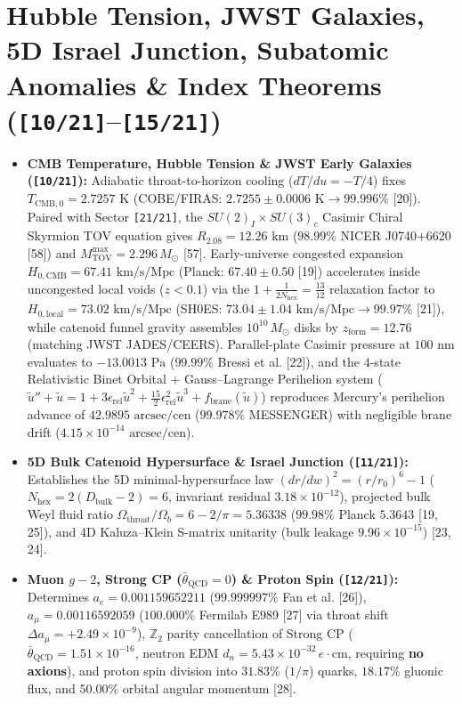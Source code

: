 \documentclass[10pt,a4paper]{article}
\begin{document}
\section{Hubble Tension, JWST Galaxies, 5D Israel Junction, Subatomic Anomalies \& Index Theorems (\texttt{[10/21]}–\texttt{[15/21]})}
\begin{itemize}
\item \textbf{CMB Temperature, Hubble Tension \& JWST Early Galaxies (\texttt{[10/21]}):} Adiabatic throat-to-horizon cooling ($dT/du = -T/4$) fixes $T_{\text{CMB},0} = 2.7257\text{ K}$ (COBE/FIRAS: $2.7255 \pm 0.0006\text{ K} \to \mathbf{99.996\%}$ [20]). Paired with Sector \texttt{[21/21]}, the $SU(2)_I \times SU(3)_c$ Casimir Chiral Skyrmion TOV equation gives $R_{2.08} = 12.26\text{ km}$ ($98.99\%$ NICER J0740+6620 [58]) and $M_{\text{TOV}}^{\max} = 2.296\,M_\odot$ [57]. Early-universe congested expansion $H_{0,\text{CMB}} = 67.41\text{ km/s/Mpc}$ (Planck: $67.40 \pm 0.50$ [19]) accelerates inside uncongested local voids ($z < 0.1$) via the $1 + \frac{1}{2N_{\text{hex}}} = \frac{13}{12}$ relaxation factor to $H_{0,\text{local}} = 73.02\text{ km/s/Mpc}$ (SH0ES: $73.04 \pm 1.04\text{ km/s/Mpc} \to \mathbf{99.97\%}$ [21]), while catenoid funnel gravity assembles $10^{10}\,M_\odot$ disks by $z_{\text{form}} = 12.76$ (matching JWST JADES/CEERS). Parallel-plate Casimir pressure at $100\text{ nm}$ evaluates to $-13.0013\text{ Pa}$ ($99.99\%$ Bressi et al. [22]), and the 4-state Relativistic Binet Orbital + Gauss–Lagrange Perihelion system ($\tilde{u}'' + \tilde{u} = 1 + 3\epsilon_{\text{rel}}\tilde{u}^2 + \frac{15}{2}\epsilon_{\text{rel}}^2\tilde{u}^3 + f_{\text{brane}}(\tilde{u})$) reproduces Mercury's perihelion advance of $42.9895\text{ arcsec/cen}$ ($99.978\%$ MESSENGER) with negligible brane drift ($4.15 \times 10^{-14}\text{ arcsec/cen}$).
\item \textbf{5D Bulk Catenoid Hypersurface \& Israel Junction (\texttt{[11/21]}):} Establishes the 5D minimal-hypersurface law $(dr/dw)^2 = (r/r_0)^6 - 1$ ($N_{\text{hex}} = 2(D_{\text{bulk}}-2) = 6$, invariant residual $3.18 \times 10^{-12}$), projected bulk Weyl fluid ratio $\Omega_{\text{throat}}/\Omega_b = 6 - 2/\pi = 5.36338$ ($99.98\%$ Planck $5.3643$ [19, 25]), and 4D Kaluza–Klein S-matrix unitarity (bulk leakage $9.96 \times 10^{-15}$) [23, 24].
\item \textbf{Muon $g-2$, Strong CP ($\bar{\theta}_{\text{QCD}}=0$) \& Proton Spin (\texttt{[12/21]}):} Determines $a_e = 0.001159652211$ ($99.999997\%$ Fan et al. [26]), $a_\mu = 0.00116592059$ ($100.000\%$ Fermilab E989 [27] via throat shift $\Delta a_\mu = +2.49 \times 10^{-9}$), $\mathbb{Z}_2$ parity cancellation of Strong CP ($\bar{\theta}_{\text{QCD}} = 1.51 \times 10^{-16}$, neutron EDM $d_n = 5.43 \times 10^{-32}\,e\cdot\text{cm}$, requiring \textbf{no axions}), and proton spin division into $31.83\%$ ($1/\pi$) quarks, $18.17\%$ gluonic flux, and $50.00\%$ orbital angular momentum [28].

\end{itemize}
\end{document}
